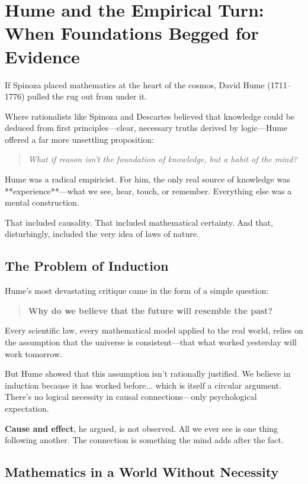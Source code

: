 \section{Hume and the Empirical Turn: When Foundations Begged for Evidence}

If Spinoza placed mathematics at the heart of the cosmos, David Hume (1711–1776) pulled the rug out from under it.

Where rationalists like Spinoza and Descartes believed that knowledge could be deduced from first principles—clear, necessary truths derived by logic—Hume offered a far more unsettling proposition:

\begin{quote}
\textit{What if reason isn't the foundation of knowledge, but a habit of the mind?}
\end{quote}

Hume was a radical empiricist. For him, the only real source of knowledge was **experience**—what we see, hear, touch, or remember. Everything else was a mental construction.

That included causality.  
That included mathematical certainty.  
And that, disturbingly, included the very idea of laws of nature.

\subsection*{The Problem of Induction}

Hume’s most devastating critique came in the form of a simple question:

\begin{quote}
\textbf{Why do we believe that the future will resemble the past?}
\end{quote}

Every scientific law, every mathematical model applied to the real world, relies on the assumption that the universe is consistent—that what worked yesterday will work tomorrow.

But Hume showed that this assumption isn’t rationally justified. We believe in induction because it has worked before... which is itself a circular argument. There’s no logical necessity in causal connections—only psychological expectation.

\textbf{Cause and effect}, he argued, is not observed. All we ever see is one thing following another. The connection is something the mind adds after the fact.

\subsection*{Mathematics in a World Without Necessity}

